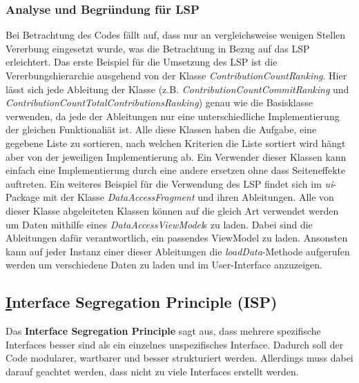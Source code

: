 \subsubsection{Analyse und Begründung für LSP}
Bei Betrachtung des Codes fällt auf, dass nur an vergleichsweise wenigen Stellen Vererbung eingesetzt wurde, was die Betrachtung in Bezug auf das LSP erleichtert.
Das erste Beispiel für die Umsetzung des LSP ist die Vererbungshierarchie ausgehend von der Klasse \textit{ContributionCountRanking}.
Hier lässt sich jede Ableitung der Klasse (z.B. \textit{ContributionCountCommitRanking} und \textit{ContributionCountTotalContributionsRanking}) genau wie die Basisklasse verwenden, da jede der Ableitungen nur eine unterschiedliche Implementierung der gleichen Funktionaliät ist.
Alle diese Klassen haben die Aufgabe, eine gegebene Liste zu sortieren, nach welchen Kriterien die Liste sortiert wird hängt aber von der jeweiligen Implementierung ab.
Ein Verwender dieser Klassen kann einfach eine Implementierung durch eine andere ersetzen ohne dass Seiteneffekte auftreten.
\newline
Ein weiteres Beispiel für die Verwendung des LSP findet sich im \textit{ui}-Package mit der Klasse \textit{DataAccessFragment} und ihren Ableitungen.
Alle von dieser Klasse abgeleiteten Klassen können auf die gleich Art verwendet werden um Daten mithilfe eines \textit{DataAccessViewModel}s zu laden.
Dabei sind die Ableitungen dafür verantwortlich, ein passendes ViewModel zu laden.
Ansonsten kann auf jeder Instanz einer dieser Ableitungen die \textit{loadData}-Methode aufgerufen werden um verschiedene Daten zu laden und im User-Interface anzuzeigen.


\newpage
\subsection{\underline{I}nterface Segregation Principle (ISP)}
\label{sec:ISP}

Das \textbf{Interface Segregation Principle} sagt aus, dass mehrere spezifische Interfaces besser sind als ein einzelnes unspezifisches Interface.
Dadurch soll der Code modularer, wartbarer und besser strukturiert werden. 
Allerdings muss dabei darauf geachtet werden, dass nicht zu viele Interfaces erstellt werden.

